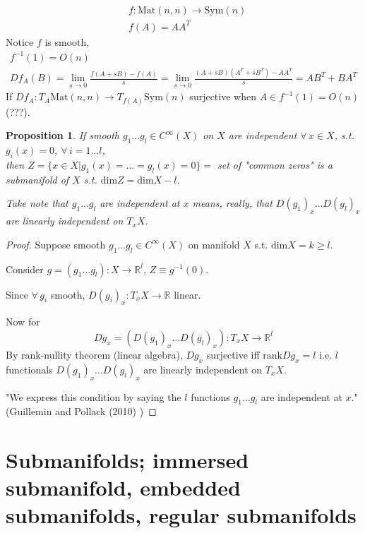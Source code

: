 \documentclass[10pt]{amsart}
\newtheorem{proposition}{Proposition}
\begin{document}
\begin{multicols*}{2}
\[
\begin{aligned}
	& f:\text{Mat}(n,n) \to \text{Sym}(n) \\
	& f(A) = AA^T
\end{aligned}
\]
Notice $f$ is smooth, 
\[
\begin{gathered}
f^{-1}(1) = O(n) \\
Df_A(B) = \lim_{s\to 0} \frac{ f(A+sB) - f(A) }{s} = \lim_{s\to 0} \frac{(A+sB)(A^T + sB^T)- AA^T}{s} = AB^T +BA^T
\end{gathered}
\]
If $Df_A : T_A\text{Mat}(n,n) \to T_{f(A)}\text{Sym}(n)$ surjective when $A\in f^{-1}(1) = O(n)$ (???).  





\begin{proposition} If smooth $g_1\dots g_l \in C^{\infty}(X)$ on $X$ are independent $\forall \, x\in X$, s.t. $g_i(x)=0$, $\forall \, i = 1\dots l$, \\
	then $Z=\lbrace x\in X | g_1(x) = \dots = g_l(x)=0 \rbrace = $ set of "common zeros" is a \emph{submanifold} of $X$ s.t. $\text{dim}Z = \text{dim}X- l$.  
	
	Take \emph{note} that $g_1 \dots g_l$ are independent at $x$ means, really, that $D(g_1)_x \dots D(g_l)_x$ are linearly independent on $T_xX$.  
\end{proposition}
\begin{proof}
Suppose smooth $g_1 \dots g_l \in C^{\infty}(X)$ on manifold $X$ s.t. $\text{dim}X = k\geq l$.  

Consider $g=(g_1\dots g_l):X \to \mathbb{R}^l$, $Z\equiv g^{-1}(0)$.  

Since $\forall \, g_i$ smooth, $D(g_i)_x:T_xX \to \mathbb{R}$ linear.  

Now for 
\[
Dg_x = (D(g_1)_x \dots D(g_l)_x):T_xX \to \mathbb{R}^l
\]	
By rank-nullity theorem (linear algebra), $Dg_x$ surjective iff $\text{rank}Dg_x = l$ i.e. $l$ functionals $D(g_1)_x \dots D(g_l)_x$ are linearly independent on $T_xX$.  

"We express this condition by saying the $l$ functions $g_1\dots g_l$ are independent at $x$."  (Guillemin and Pollack (2010) \cite{VGuilleminAPollack2010})  
	
	
	\end{proof}

\section{Submanifolds; immersed submanifold, embedded submanifolds, regular submanifolds}  


\end{multicols*}
\end{document}
